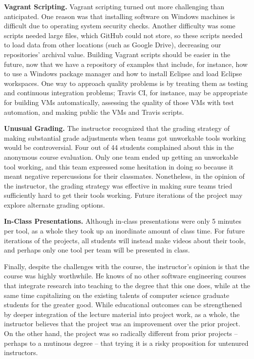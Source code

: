 \documentclass[10pt,conference]{IEEEtran}
\begin{document}
\textbf{Vagrant Scripting.}
  	Vagrant scripting turned out more challenging than anticipated.
  	One reason was that installing software on Windows machines is difficult
  	due to operating system security checks.
  	Another difficulty was some scripts needed large files, which GitHub could not
  	store, so these scripts needed to load data from other locations 
  	(such as Google Drive), decreasing our repositories' archival value. 
  	Building Vagrant scripts should be easier in the future, now that
  	we have a repository of examples that include, for instance, how to
  	use a Windows package manager and how to 
  	install Eclipse and load Eclipse workspaces. 
  	One way to approach quality problems is by treating them as testing and 
  	continuous integration problems; Travis CI,
  	for instance, may be appropriate for building VMs automatically,
  	assessing the quality of those VMs with test automation,
  	and making public the VMs and Travis scripts.

\textbf{Unusual Grading.} 
	The instructor recognized that the grading strategy of making substantial
	grade adjustments when teams got unworkable tools working would be 
	controversial.
	Four out of 44 students complained about this in the anonymous course
	evaluation.
	Only one team ended up getting an unworkable tool working, and this team expressed
	some hesitation in doing so because it meant negative repercussions for their
	classmates.
	Nonetheless, in the opinion of the instructor, the grading strategy was effective
	in making sure teams tried sufficiently hard to get their tools working. 
 	Future iterations of the project may explore alternate grading options.

\textbf{In-Class Presentations.}
  	Although in-class presentations were only 5 minutes per tool, as a whole they
  	took up an inordinate amount of class time.
  	For future iterations of the projects, all students will instead make videos 
  	about their tools, and perhaps only one tool per team will be presented
  	in class.
 
\vspace{3mm}
Finally, despite the challenges with the course, the instructor's opinion is that 
the course was highly worthwhile.
He knows of no other software engineering courses that integrate research into 
teaching to the degree that this one does, while at the same time capitalizing
on the existing talents of computer science graduate students for the greater 
good.
While educational outcomes can be strengthened by deeper integration of the lecture
material into project work, as a whole, the instructor believes that 
the project was an improvement over the prior project.
On the other hand, the project was so radically different from prior 
projects -- perhaps to a mutinous degree -- that trying it is a risky 
proposition for untenured instructors.
\end{document}
